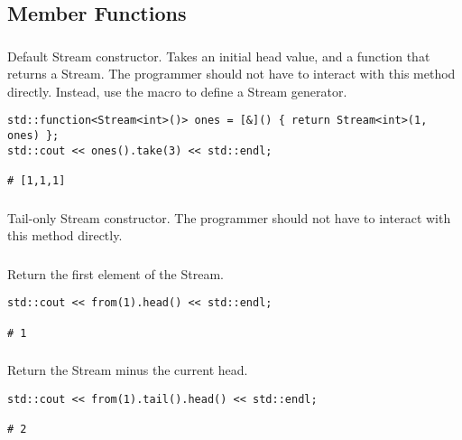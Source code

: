 
\subsection{Member Functions}

\subsubsection{}

Default Stream constructor.
Takes an initial head value, and a function that returns a Stream.
The programmer should not have to interact with this method directly.
Instead, use the  macro to define a Stream generator.


\begin{lstlisting}[title=example]
std::function<Stream<int>()> ones = [&]() { return Stream<int>(1, ones) };
std::cout << ones().take(3) << std::endl;

# [1,1,1]
\end{lstlisting}

\subsubsection{}

Tail-only Stream constructor.
The programmer should not have to interact with this method directly.

\subsubsection{}

Return the first element of the Stream.

\begin{lstlisting}[title=example]
std::cout << from(1).head() << std::endl;

# 1
\end{lstlisting}

\subsubsection{}

Return the Stream minus the current head.

\begin{lstlisting}[title=example]
std::cout << from(1).tail().head() << std::endl;

# 2
\end{lstlisting}

